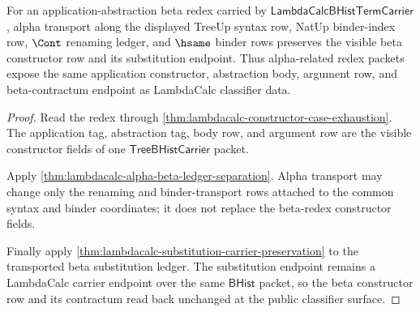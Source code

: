 \begin{theorem}
\label{thm:lambdacalc-alpha-beta-constructor-transport}
For an application-abstraction beta redex carried by
$\mathsf{LambdaCalcBHistTermCarrier}$, alpha transport along the displayed
TreeUp syntax row, NatUp binder-index row, $\Cont$ renaming ledger, and
$\hsame$ binder rows preserves the visible beta constructor row and its
substitution endpoint. Thus alpha-related redex packets expose the same
application constructor, abstraction body, argument row, and beta-contractum
endpoint as LambdaCalc classifier data.
\end{theorem}
\begin{proof}
Read the redex through
\autoref{thm:lambdacalc-constructor-case-exhaustion}. The application tag,
abstraction tag, body row, and argument row are the visible constructor fields
of one $\mathsf{TreeBHistCarrier}$ packet.

Apply \autoref{thm:lambdacalc-alpha-beta-ledger-separation}. Alpha transport
may change only the renaming and binder-transport rows attached to the common
syntax and binder coordinates; it does not replace the beta-redex constructor
fields.

Finally apply \autoref{thm:lambdacalc-substitution-carrier-preservation} to
the transported beta substitution ledger. The substitution endpoint remains a
LambdaCalc carrier endpoint over the same $\mathsf{BHist}$ packet, so the beta
constructor row and its contractum read back unchanged at the public
classifier surface.
\end{proof}

